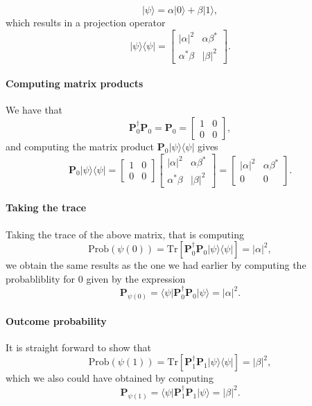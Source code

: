 \[
\vert \psi \rangle = \alpha \vert 0\rangle+\beta \vert 1\rangle,
\]
which results in a projection operator
\[
\vert \psi \rangle\langle \psi\vert = \begin{bmatrix} \vert \alpha \vert^2 & \alpha\beta^* \\ \alpha^*\beta & \vert\beta\vert^2\end{bmatrix}.
\]


\paragraph{Computing matrix products}
We have that
\[
\bm{P}_0^{\dagger}\bm{P}_0=\bm{P}_0=\begin{bmatrix} 1 & 0 \\ 0 & 0\end{bmatrix},
\]
and computing the matrix product $\bm{P}_0\vert\psi\rangle\langle \psi\vert$ gives
\[
\bm{P}_0\vert\psi\rangle\langle \psi\vert=\begin{bmatrix} 1 & 0 \\ 0 & 0\end{bmatrix}\begin{bmatrix} \vert \alpha \vert^2 & \alpha\beta^* \\ \alpha^*\beta & \vert\beta\vert^2\end{bmatrix}=\begin{bmatrix} \vert \alpha \vert^2 & \alpha\beta^* \\ 0 & 0\end{bmatrix}.
\]


\paragraph{Taking the trace}

Taking the trace of the above matrix, that is computing
\[
\mathrm{Prob}(\psi(0))=\mathrm{Tr}\left[\bm{P}_0^{\dagger}\bm{P}_0\vert \psi\rangle\langle \psi\vert\right]=\vert \alpha\vert^2,
\]
we obtain the same results as the one we had earlier by computing
the probabliblity for $0$ given by the expression
\[
\bm{P}_{\psi(0)}=\langle \psi\vert \bm{P}_0^{\dagger}\bm{P}_0\vert \psi\rangle=\vert \alpha\vert^2.
\]


\paragraph{Outcome probability}

It is straight forward to show that
\[
\mathrm{Prob}(\psi(1))=\mathrm{Tr}\left[\bm{P}_1^{\dagger}\bm{P}_1\vert \psi\rangle\langle \psi\vert\right]=\vert \beta\vert^2,
\]
which we also could have obtained by computing
\[
\bm{P}_{\psi(1)}=\langle \psi\vert \bm{P}_1^{\dagger}\bm{P}_1\vert \psi\rangle=\vert \beta\vert^2.
\]


